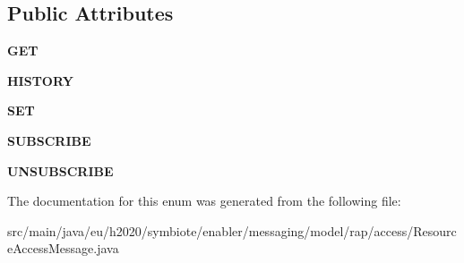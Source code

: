 \subsection*{Public Attributes}
\begin{DoxyCompactItemize}
\item 
\mbox{\label{enumeu_1_1h2020_1_1symbiote_1_1enabler_1_1messaging_1_1model_1_1rap_1_1access_1_1ResourceAccessMessage_1_1AccessType_a4283fd70e6bf75309c7fe67826760e39}} 
{\bfseries G\+ET}
\item 
\mbox{\label{enumeu_1_1h2020_1_1symbiote_1_1enabler_1_1messaging_1_1model_1_1rap_1_1access_1_1ResourceAccessMessage_1_1AccessType_a8cbc87c1cd512566384d3973e46e261a}} 
{\bfseries H\+I\+S\+T\+O\+RY}
\item 
\mbox{\label{enumeu_1_1h2020_1_1symbiote_1_1enabler_1_1messaging_1_1model_1_1rap_1_1access_1_1ResourceAccessMessage_1_1AccessType_a60fe54c9801da3e21b51b924c258334a}} 
{\bfseries S\+ET}
\item 
\mbox{\label{enumeu_1_1h2020_1_1symbiote_1_1enabler_1_1messaging_1_1model_1_1rap_1_1access_1_1ResourceAccessMessage_1_1AccessType_a0b6f5963fbc359a276c490dc94fcbb97}} 
{\bfseries S\+U\+B\+S\+C\+R\+I\+BE}
\item 
\mbox{\label{enumeu_1_1h2020_1_1symbiote_1_1enabler_1_1messaging_1_1model_1_1rap_1_1access_1_1ResourceAccessMessage_1_1AccessType_a4f808a3a7949452a87e537b7418505ad}} 
{\bfseries U\+N\+S\+U\+B\+S\+C\+R\+I\+BE}
\end{DoxyCompactItemize}


The documentation for this enum was generated from the following file\+:\begin{DoxyCompactItemize}
\item 
src/main/java/eu/h2020/symbiote/enabler/messaging/model/rap/access/Resource\+Access\+Message.\+java\end{DoxyCompactItemize}

